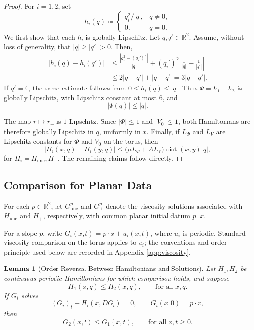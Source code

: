 \documentclass[11pt,reqno,noamsfonts]{amsart}
\newtheorem{lemma}[theorem]{Lemma}
\theoremstyle{definition}
\theoremstyle{remark}
\newcommand{\dist}{\operatorname{dist}}
\newcommand{\Hunc}{H_{\mathrm{unc}}}
\newcommand{\Hcut}{H_{+}}
\begin{document}
\begin{proof}
For $i=1,2$, set
\[
  h_i(q)
  \coloneqq 
  \begin{cases}
  q_i^2/|q|,&q\ne0,\\
  0,&q=0.
  \end{cases}
\]
We first show that each $h_i$ is globally Lipschitz. Let $q,q'\in\mathbb R^2$. Assume, without loss of generality, that
$|q|\ge|q'|>0$. Then,
\begin{align*}
  |h_i(q)-h_i(q')|
  &\le
  \frac{|q_i^2-(q_i')^2|}{|q|}
  +(q_i')^2
  \left|\frac1{|q|}-\frac1{|q'|}\right|\\
  &\le 2|q-q'|+|q-q'|
  =3|q-q'|.
\end{align*}
If $q'=0$, the same estimate follows from
$0\le h_i(q)\le|q|$. Thus $\Psi=h_1-h_2$ is globally Lipschitz, with
Lipschitz constant at most $6$, and
\[
  |\Psi(q)|\le|q|.
\]

The map $r\mapsto r_+$ is $1$-Lipschitz. Since
$|\Phi|\le1$ and $|V_0|\le1$, both Hamiltonians are therefore globally
Lipschitz in $q$, uniformly in $x$. Finally, if $L_\Phi$ and $L_V$ are
Lipschitz constants for $\Phi$ and $V_0$ on the torus, then
\[
  |H_i(x,q)-H_i(y,q)|
  \le
  \bigl(\mu L_\Phi+A L_V\bigr)
  \dist(x,y)|q|,
\]
for $H_i=\Hunc,\Hcut$. The remaining claims follow directly.
\end{proof}

\subsection{Comparison for Planar Data}
For each $p\in\mathbb R^2$, let
  $G_{\mathrm{unc}}^p$
   and 
  $G_+^p$ denote the viscosity solutions associated with $\Hunc$ and $\Hcut$,
respectively, with common planar initial datum $p\cdot x$.

For a slope $p$, write $G_i(x,t)=p\cdot x+u_i(x,t)$, where $u_i$
is periodic. Standard viscosity comparison on the torus applies to
$u_i$; the conventions and order principle used below are recorded in
Appendix \ref{app:viscosity}.

\begin{lemma}[Order Reversal Between Hamiltonians and Solutions]\label{lem:comparison}
Let $H_1,H_2$ be continuous periodic Hamiltonians for which comparison holds, and suppose
\[
  H_1(x,q)\le H_2(x,q),
  \qquad\text{for all }x,q.
\]
If $G_i$ solves
\[
  (G_i)_t+H_i(x,DG_i)=0,
  \qquad
  G_i(x,0)=p\cdot x,
\]
then
\[
  G_2(x,t)\le G_1(x,t),
  \qquad\text{for all }x,t\ge0.
\]
\end{lemma}
\end{document}
